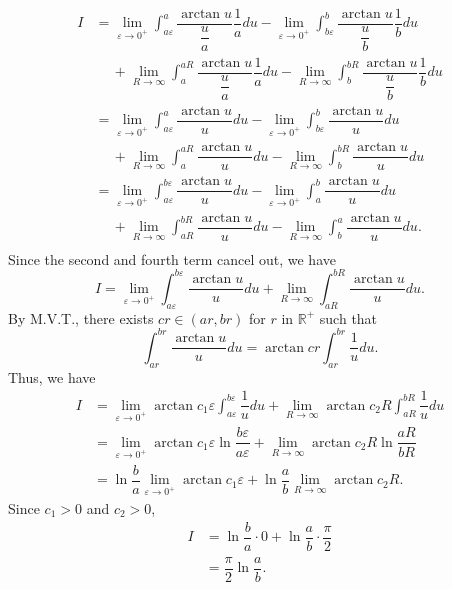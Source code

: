 \documentclass{article}
\begin{document}
\begin{enumerate}[(1)]
\begin{enumerate}
\begin{align*}
            I&=\lim_{\varepsilon\to0^+}{\int_{a\varepsilon}^a{\dfrac{\arctan{u}}{\dfrac{u}{a}}\dfrac{1}{a}du}}-\lim_{\varepsilon\to0^+}{\int_{b\varepsilon}^b{\dfrac{\arctan{u}}{\dfrac{u}{b}}\dfrac{1}{b}du}}\\
            &\quad\:+\lim_{R\to\infty}{\int_a^{aR}{\dfrac{\arctan{u}}{\dfrac{u}{a}}\dfrac{1}{a}du}}-\lim_{R\to\infty}{\int_b^{bR}{\dfrac{\arctan{u}}{\dfrac{u}{b}}\dfrac{1}{b}du}}\\
            &=\lim_{\varepsilon\to0^+}{\int_{a\varepsilon}^a{\dfrac{\arctan{u}}{u}du}}-\lim_{\varepsilon\to0^+}{\int_{b\varepsilon}^b{\dfrac{\arctan{u}}{u}du}}\\
            &\quad\:+\lim_{R\to\infty}{\int_a^{aR}{\dfrac{\arctan{u}}{u}du}}-\lim_{R\to\infty}{\int_b^{bR}{\dfrac{\arctan{u}}{u}du}}\\
            &=\lim_{\varepsilon\to0^+}{\int_{a\varepsilon}^{b\varepsilon}{\dfrac{\arctan{u}}{u}du}}-\lim_{\varepsilon\to0^+}{\int_a^b{\dfrac{\arctan{u}}{u}du}}\\
            &\quad\:+\lim_{R\to\infty}{\int_{aR}^{bR}{\dfrac{\arctan{u}}{u}du}}-\lim_{R\to\infty}{\int_b^a{\dfrac{\arctan{u}}{u}du}}.\\
        \end{align*}
        Since the second and fourth term cancel out, we have $$I=\lim_{\varepsilon\to0^+}{\int_{a\varepsilon}^{b\varepsilon}{\dfrac{\arctan{u}}{u}du}}+\lim_{R\to\infty}{\int_{aR}^{bR}{\dfrac{\arctan{u}}{u}du}}.$$
        By M.V.T., there exists $cr\in(ar,br)$ for $r$ in $\mathbb{R}^+$ such that $$\int_{ar}^{br}{\dfrac{\arctan{u}}{u}du}=\arctan{cr}\int_{ar}^{br}{\dfrac{1}{u}du}.$$
        Thus, we have
        \begin{align*}
            I&=\lim_{\varepsilon\to0^+}{\arctan{c_1\varepsilon}\int_{a\varepsilon}^{b\varepsilon}{\dfrac{1}{u}du}}+\lim_{R\to\infty}{\arctan{c_2R}\int_{aR}^{bR}{\dfrac{1}{u}du}}\\
            &=\lim_{\varepsilon\to0^+}{\arctan{c_1\varepsilon}\ln{\dfrac{b\varepsilon}{a\varepsilon}}}+\lim_{R\to\infty}{\arctan{c_2R}\ln{\dfrac{aR}{bR}}}\\
            &=\ln{\dfrac{b}{a}}\lim_{\varepsilon\to0^+}{\arctan{c_1\varepsilon}}+\ln{\dfrac{a}{b}}\lim_{R\to\infty}{\arctan{c_2R}}.
        \end{align*}
        Since $c_1>0$ and $c_2>0$,
        \begin{align*}
            I&=\ln{\dfrac{b}{a}}\cdot0+\ln{\dfrac{a}{b}}\cdot\dfrac{\pi}{2}\\
            &=\dfrac{\pi}{2}\ln{\dfrac{a}{b}}.

\end{align*}
\end{enumerate}
\end{enumerate}
\end{document}
